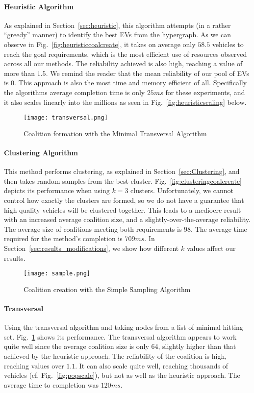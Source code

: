 \paragraph{Heuristic Algorithm}
As explained in Section~\ref{sec:heuristic}, this algorithm attempts (in a rather ``greedy'' manner) to identify the best EVs from the hypergraph.	As we can observe in Fig.~\ref{fig:heuristiccoalcreate}, it takes on average only $58.5$ vehicles to reach the goal requirements, which is the most efficient use of resources observed across all our methods. The reliability achieved is also high, reaching a value of more than $1.5$. We remind the reader that the mean reliability of our pool of EVs is $0$. This approach is also the most time and memory efficient of all. Specifically the algorithms average completion time is only $25ms$ for these experiments, and it also scales linearly into the millions as seen in Fig.~\ref{fig:heuristicscaling} below.	
\begin{figure}
	\centering
	\centering
	\texttt{[image: transversal.png]}
	\caption{Coalition formation with the\newline
		Minimal Transversal Algorithm \label{fig:transversalcoalcreate}}
\end{figure}
\paragraph{Clustering Algorithm}
This method performs clustering, as explained in Section~\ref{sec:Clustering}, and then takes random samples from the best cluster. Fig.~\ref{fig:clusteringcoalcreate} depicts its performance when using $k=3$ clusters. Unfortunately, we cannot control how exactly the clusters are formed, so we do not have a guarantee that high quality vehicles will be clustered together. This leads to a mediocre result with an increased average coalition size, and a slightly-over-the-average reliability. The average size of coalitions meeting both requirements is $98$. The average time required for the method's completion is $709 ms$. In Section~\ref{sec:results_modifications}, we show how different $k$ values affect our results.
\begin{figure}		
	\centering
		\texttt{[image: sample.png]}
		\caption{Coalition creation with the\newline
			Simple Sampling Algorithm \label{fig:samplecoalcreate}}
\end{figure}
\paragraph{Transversal}	
Using the transversal algorithm and taking nodes from a list of minimal hitting set. Fig.~\ref{fig:transversalcoalcreate} shows its performance. The transversal algorithm appears to work quite well since the average coalition size is only 64, slightly higher than that achieved by the heuristic approach. The reliability of the coalition is high, reaching  values over $1.1$. It can also scale quite well, reaching thousands of vehicles (cf. Fig.~\ref{fig:popscale}), but not as well as the heuristic approach. The average time to completion was $120ms$. %
